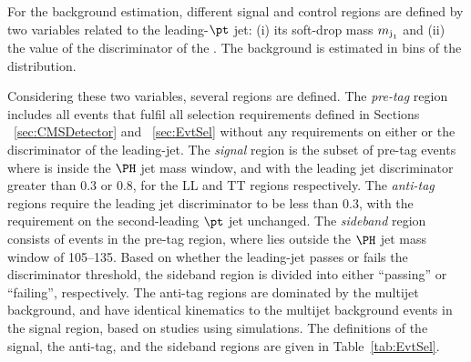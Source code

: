 For the background estimation, different signal and control regions are defined by two variables related to the
leading-$\pt$ jet: (i) its soft-drop mass $m_{\text{j}_{1}}$ and (ii) the value
of the discriminator of the \Hbbt. The background is estimated in bins
of the \mjjs distribution. 

Considering these two variables, several
regions are defined.
The \textit{pre-tag} region includes all events that fulfil all
selection requirements defined in Sections ~\ref{sec:CMSDetector} and
~\ref{sec:EvtSel} without any requirements on either \mjone or the
\Hbbt discriminator of the leading-\pt jet. 
The \textit{signal} region is the subset of pre-tag events where \mjone is
inside the $\PH$ jet mass window, and with the leading jet \Hbbt discriminator
greater than 0.3 or 0.8, for the LL and TT regions respectively. 
The \textit{anti-tag} regions require the leading jet \Hbbt discriminator to be less than 0.3, with the requirement on the second-leading $\pt$ jet unchanged. 
The \mjone \textit{sideband} region consists of events in the pre-tag region, where
\mjone lies outside the $\PH$ jet mass window of 105--135\GeV. Based on whether the leading-\pt jet passes or fails the \Hbbt discriminator threshold, the sideband region is divided into either ``passing'' or ``failing'', respectively.
The anti-tag regions are dominated by the multijet background, and have identical kinematics to the multijet background events in the signal region, based on studies using \mc simulations.
The definitions of the signal, the anti-tag, and the sideband regions are given in Table~\ref{tab:EvtSel}.


